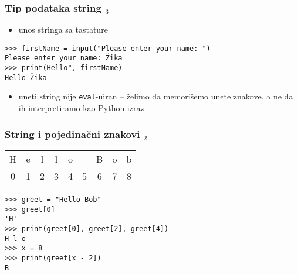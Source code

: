 \documentclass[utf8,compress]{beamer}
\begin{document}
\begin{frame}[fragile]
  \frametitle{Tip podataka string $_3$}
  \begin{itemize}
    \item unos stringa sa tastature
  \end{itemize}
\begin{verbatim}
>>> firstName = input("Please enter your name: ")
Please enter your name: Žika
>>> print(Hello", firstName)
Hello Žika
\end{verbatim}
  \begin{itemize}
    \item uneti string nije \texttt{eval}-uiran -- želimo da memorišemo unete znakove, a ne da ih interpretiramo kao Python izraz
  \end{itemize}
\end{frame}


\begin{frame}[fragile]
  \frametitle{String i pojedinačni znakovi $_2$}
\begin{tabular}{|c|c|c|c|c|c|c|c|c|}
\cline{1-9}
H & e & l & l & o & \  & B & o & b \\ \cline{1-9}
\multicolumn{1}{c}{0} & \multicolumn{1}{c}{1} & \multicolumn{1}{c}{2} & \multicolumn{1}{c}{3} & \multicolumn{1}{c}{4} & \multicolumn{1}{c}{5} & \multicolumn{1}{c}{6} & \multicolumn{1}{c}{7} & \multicolumn{1}{c}{8}
\end{tabular}
\begin{verbatim}
>>> greet = "Hello Bob"
>>> greet[0]
'H'
>>> print(greet[0], greet[2], greet[4])
H l o
>>> x = 8
>>> print(greet[x - 2])
B
\end{verbatim}
\end{frame}
\end{document}
